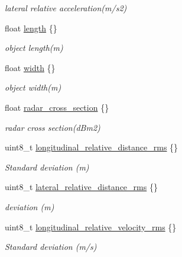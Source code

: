 \begin{DoxyCompactItemize}
\begin{DoxyCompactList}\small\item\em lateral relative acceleration(m/s2) \end{DoxyCompactList}\item 
float \hyperlink{structmaf__perception__interface_1_1ContiRadarPerceptionObjectData_a7b096818e07311d4ed1f910045895c9a}{length} \{\}
\begin{DoxyCompactList}\small\item\em object length(m) \end{DoxyCompactList}\item 
float \hyperlink{structmaf__perception__interface_1_1ContiRadarPerceptionObjectData_a6a6bce9adcde34447c77f8b93f3aaaff}{width} \{\}
\begin{DoxyCompactList}\small\item\em object width(m) \end{DoxyCompactList}\item 
float \hyperlink{structmaf__perception__interface_1_1ContiRadarPerceptionObjectData_acddadb2d5ab2c984ed6e9e674d003c7b}{radar\+\_\+cross\+\_\+section} \{\}
\begin{DoxyCompactList}\small\item\em radar cross section(d\+Bm2) \end{DoxyCompactList}\item 
uint8\+\_\+t \hyperlink{structmaf__perception__interface_1_1ContiRadarPerceptionObjectData_acc6851da9be1eb2fefd07a17d28e0773}{longitudinal\+\_\+relative\+\_\+distance\+\_\+rms} \{\}
\begin{DoxyCompactList}\small\item\em Standard deviation (m) \end{DoxyCompactList}\item 
uint8\+\_\+t \hyperlink{structmaf__perception__interface_1_1ContiRadarPerceptionObjectData_ae3cfdb3b57372370e55e3568645b5624}{lateral\+\_\+relative\+\_\+distance\+\_\+rms} \{\}
\begin{DoxyCompactList}\small\item\em deviation (m) \end{DoxyCompactList}\item 
uint8\+\_\+t \hyperlink{structmaf__perception__interface_1_1ContiRadarPerceptionObjectData_adc11bb4d78c2420d9a6e8d14e31b2d21}{longitudinal\+\_\+relative\+\_\+velocity\+\_\+rms} \{\}
\begin{DoxyCompactList}\small\item\em Standard deviation (m/s) \end{DoxyCompactList}\item 

\end{DoxyCompactItemize}
